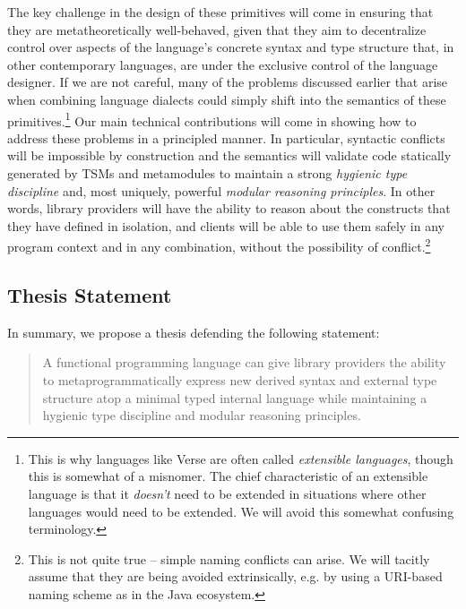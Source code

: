 The key challenge in the design of these primitives will come in ensuring that they are metatheoretically well-behaved, given that they aim to decentralize control over aspects of the language's concrete syntax and type structure that, in other contemporary languages, are under the exclusive control of the language designer. If we are not careful, many of the problems discussed earlier that arise when combining language dialects could simply shift into the semantics of these primitives.\footnote{This is why languages  like Verse are often called \emph{extensible languages}, though this is somewhat of a misnomer. The chief characteristic of an extensible language is that it \emph{doesn't} need to be extended in situations where other languages would need to be extended. We will avoid this somewhat confusing terminology.} Our main technical contributions will come in showing how to address these problems in a principled manner. In particular, syntactic conflicts will be impossible by construction and the semantics will validate code statically generated by TSMs and metamodules to maintain a strong \emph{hygienic type discipline} and, most uniquely, powerful \emph{modular reasoning principles}. In other words, library providers will have the ability to reason about the constructs that they have defined in isolation, and clients will be able to use them safely in any program context and in any combination, without the possibility of conflict.\footnote{This is not quite true -- simple naming conflicts can arise. We will tacitly assume that they are being avoided extrinsically, e.g. by using a URI-based naming scheme as in the Java ecosystem.}




\subsection{Thesis Statement}
In summary, we propose a thesis defending the following statement:
\begin{quote}
A functional programming language can give library providers the ability to meta\-pro\-gram\-matic\-ally express new derived syntax and external type structure atop a minimal typed internal language while maintaining a hygienic type discipline and modular reasoning principles. %
\end{quote}

